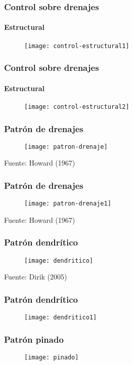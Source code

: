\documentclass[14pt]{beamer}
\begin{document}
  \begin{frame}
\frametitle{Control sobre drenajes}
\framesubtitle{Estructural}
 \begin{figure}
    \centering
    \texttt{[image: control-estructural1]}
  \end{figure}
\end{frame}
  \begin{frame}
\frametitle{Control sobre drenajes}
\framesubtitle{Estructural}
 \begin{figure}
    \centering
    \texttt{[image: control-estructural2]}
  \end{figure}
\end{frame}
  \begin{frame}
\frametitle{Patrón de drenajes}
 \begin{figure}
    \centering
    \texttt{[image: patron-drenaje]}
  \end{figure}
  \tiny{Fuente: Howard (1967)}
\end{frame}
  \begin{frame}
\frametitle{Patrón de drenajes}
 \begin{figure}
    \centering
    \texttt{[image: patron-drenaje1]}
  \end{figure}
  \tiny{Fuente: Howard (1967)}
\end{frame}
  \begin{frame}
\frametitle{Patrón dendrítico}
 \begin{figure}
    \centering
    \texttt{[image: dendritico]}
  \end{figure}
  \tiny{Fuente: Dirik (2005)}
\end{frame}
  \begin{frame}
\frametitle{Patrón dendrítico}
 \begin{figure}
    \centering
    \texttt{[image: dendritico1]}
  \end{figure}
\end{frame}
 \begin{frame}
\frametitle{Patrón pinado}
 \begin{figure}
    \centering
    \texttt{[image: pinado]}
  \end{figure}
\end{frame}
\end{document}

